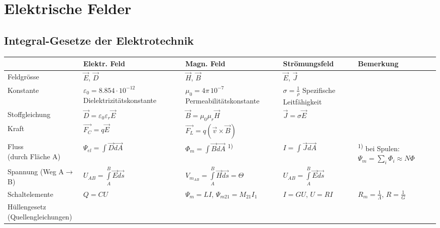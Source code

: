 \section{Elektrische Felder}

\subsection{Integral-Gesetze der Elektrotechnik}
	
	\begin{tabular}{|p{2.5cm}||p{2.7cm}|p{4cm}|p{2.7cm}|p{5cm}|}
	\hline
	& \textbf{Elektr. Feld} & \textbf{Magn. Feld} & \textbf{Strömungsfeld} & 		
			\textbf{Bemerkung}\\
	\hline \hline
	Feldgrösse & $\vec{E}$, $\vec{D}$ & $\vec{H}$, $\vec{B}$
		& $\vec{E}$, $\vec{J}$ &\\
	\hline
	Konstante
		& \parbox{2.7cm}{$\varepsilon_0 = 8.854 \cdot 10^{-12}$\\
		{\tiny Dielektrizitätskonstante} \vspace{.1cm}} 
		& \parbox{4cm}{$\mu_0 = 4 \pi \, 10^{-7}$\\ {\tiny Permeabilitätskonstante} \vspace{.1cm}} 
		& \parbox{2.7cm}{$\sigma=\frac{1}{\rho}$ \\ {\tiny Spezifische
		Leitfähigkeit}\vspace{.1cm}} &\\ 
	\hline
	Stoffgleichung & $\vec{D}=\varepsilon_0\varepsilon_r\vec{E}$ & 	
		$\vec{B}=\mu_0\mu_r\vec{H}$
	& $\vec{J}=\sigma\vec{E}$ &
	\\
	\hline
	Kraft & $\vec{F_C}=q\vec{E}$ & $\vec{F_L}=q(\vec{v}\times\vec{B})$ &&\\
	\hline
	\parbox{2.5cm}{Fluss\\{\tiny (durch Fläche A)}} & $\Psi_{el}=\int\vec{D}\vec{dA}$ &
	$\Phi_m=\int\vec{B}\vec{dA}$ \textsuperscript{1)}&
	$I=\int\vec{J}\vec{dA}$ & \textsuperscript{1)} bei Spulen:
	$\Psi_m=\sum_i\Phi_i\approx N \Phi$\\
	\hline
	\parbox{2.5cm}{Spannung \\{\tiny (Weg A$\to$B)}} & $U_{AB}=\int\limits_{A}^B
	\vec{E}\vec{ds}$ & $V_{m_{AB}}=\int\limits_{A}^B\vec{H}\vec{ds} = \Theta$ 
	& $U_{AB}=\int\limits_{A}^B\vec{E}\vec{ds}$ & \\
	\hline
	Schaltelemente & $Q=CU$ & $\Psi_m=LI$, $\Psi_{m21}=M_{21}I_1$
	& $I=GU$, $U=RI$ & $R_m=\frac{1}{\Lambda}$, $R=\frac{1}{G}$\\
	\hline
	\parbox{2.5cm}{Hüllengesetz \\ {\tiny (Quellengleichungen)}}

\end{tabular}
